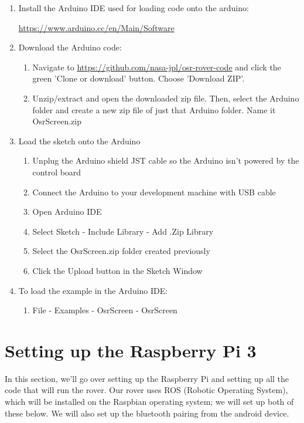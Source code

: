 \documentclass{article}
\begin{document}
\begin{enumerate} 
\item Install the Arduino IDE used for loading code onto the arduino:

	\href{https://www.arduino.cc/en/Main/Software}{https://www.arduino.cc/en/Main/Software}

\item Download the Arduino code:
	\begin{enumerate}
	\item Navigate to \href{https://github.com/nasa-jpl/osr-rover-code}{https://github.com/nasa-jpl/osr-rover-code} and click the green 'Clone or download' button. Choose 'Download ZIP'.
	\item Unzip/extract and open the downloaded zip file. Then, select the Arduino folder and create a new zip file of just that Arduino folder. Name it OsrScreen.zip
	\end{enumerate}

\item Load the sketch onto the Arduino
	\begin{enumerate}
	\item Unplug the Arduino shield JST cable so the Arduino isn't powered by the control board
	\item Connect the Arduino to your development machine with USB cable
	\item Open Arduino IDE
	\item Select Sketch - Include Library - Add .Zip Library 
	\item Select the OsrScreen.zip folder created previously
	\item Click the Upload button in the Sketch Window	
	\end{enumerate}

\item To load the example in the Arduino IDE: 
	\begin{enumerate}
	\item File - Examples - OsrScreen - OsrScreen 
	\end{enumerate}

\end{enumerate}

\section{Setting up the Raspberry Pi 3}
In this section, we'll go over setting up the Raspberry Pi and setting up all the code that will run the rover. Our rover uses ROS (Robotic Operating System), which will be installed on the Raspbian operating system; we will set up both of these below.  We will also set up the bluetooth pairing from the android device.
\end{document}
